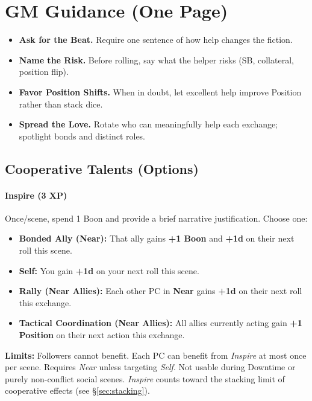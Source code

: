 \section{GM Guidance (One Page)}
\label{sec:coord-gm}
\begin{itemize}
  \item \textbf{Ask for the Beat.} Require one sentence of how help changes the fiction.
  \item \textbf{Name the Risk.} Before rolling, say what the helper risks (SB, collateral, position flip).
  \item \textbf{Favor Position Shifts.} When in doubt, let excellent help improve Position rather than stack dice.
  \item \textbf{Spread the Love.} Rotate who can meaningfully help each exchange; spotlight bonds and distinct roles.
\end{itemize}

\subsection{Cooperative Talents (Options)}

\paragraph{Inspire (3 XP)}
Once/scene, spend 1 Boon and provide a brief narrative justification. Choose one:
\begin{itemize}
  \item \textbf{Bonded Ally (Near):} That ally gains \textbf{+1 Boon} and \textbf{+1d} on their next roll this scene.
  \item \textbf{Self:} You gain \textbf{+1d} on your next roll this scene.
  \item \textbf{Rally (Near Allies):} Each other PC in \textbf{Near} gains \textbf{+1d} on their next roll this exchange.
  \item \textbf{Tactical Coordination (Near Allies):} All allies currently acting gain \textbf{+1 Position} on their next action this exchange.
\end{itemize}
\textbf{Limits:} Followers cannot benefit. Each PC can benefit from \emph{Inspire} at most once per scene. Requires \emph{Near} unless targeting \emph{Self}. Not usable during Downtime or purely non-conflict social scenes. \emph{Inspire} counts toward the stacking limit of cooperative effects (see \S\ref{sec:stacking}).

